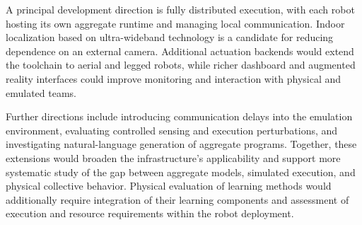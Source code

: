 A principal development direction is fully distributed execution,
 with each robot hosting its own aggregate runtime and managing local
 communication.
%
Indoor localization based on ultra-wideband technology is a candidate
 for reducing dependence on an external camera.
%
Additional actuation backends would extend the toolchain to aerial and
 legged robots, while richer dashboard and augmented reality interfaces
 could improve monitoring and interaction with physical and emulated teams.

Further directions include introducing communication delays into the
 emulation environment, evaluating controlled sensing and execution
 perturbations, and investigating natural-language generation of aggregate
 programs.
%
Together, these extensions would broaden the infrastructure's applicability
 and support more systematic study of the gap between aggregate models,
 simulated execution, and physical collective behavior.
%
Physical evaluation of learning methods would additionally require
 integration of their learning components and assessment of execution
 and resource requirements within the robot deployment.